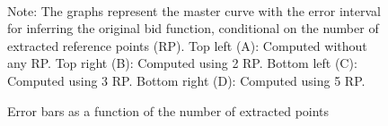 \begin{figure}[!ht]
\begin{center}
 \\
\caption{Error bars as a function of the number of extracted points}
\label{errorbarsasfunction}
\end{center}
{ \small Note: The graphs represent the master curve with the error interval for inferring the original bid function, conditional on the number of extracted reference  points (RP). Top left (A): Computed without any RP. Top right (B): Computed using 2 RP. Bottom left (C): Computed using 3 RP. Bottom right (D): Computed using 5 RP. } 
\end{figure}

